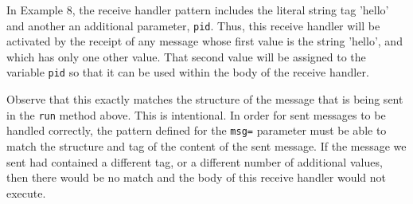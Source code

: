 \documentclass[11pt]{article}
\begin{document}
In Example 8, the receive handler pattern includes the literal string tag
'hello' and another an additional parameter, \texttt{pid}. Thus, this receive
handler will be activated by the receipt of any message whose first value is
the string 'hello', and which has only one other value. That second value will
be assigned to the variable \texttt{pid} so that it can be used within the body
of the receive handler.

Observe that this exactly matches the structure of the message that is being
sent in the \texttt{run} method above. This is intentional. In order for sent
messages to be handled correctly, the pattern defined for the \texttt{msg=}
parameter must be able to match the structure and tag of the content of the
sent message. If the message we sent had contained a different tag, or a
different number of additional values, then there would be no match and the
body of this receive handler would not execute. 
\end{document}

